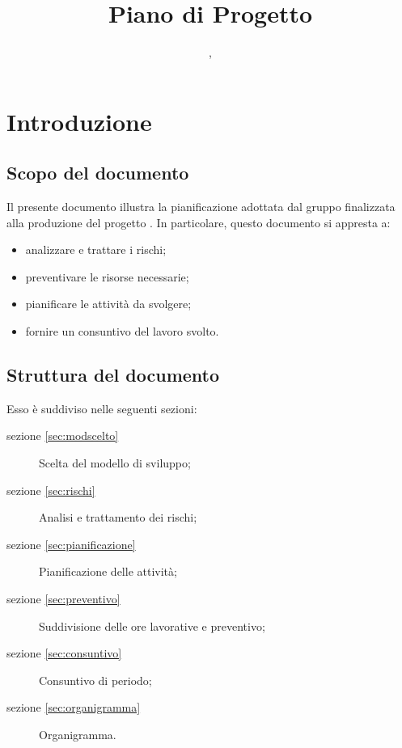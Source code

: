 

\author{\LB, \PB}
\supervisor{\GG, \MM}
\dest{\TV, \ZU}
\title{Piano di Progetto}


\maketitle

\tableofcontents
\listoffigures
\newpage






\section{Introduzione}

\subsection{Scopo del documento}
Il presente documento illustra la pianificazione adottata dal gruppo \hx{} finalizzata alla produzione del progetto \proj.
In particolare, questo documento si appresta a:
\begin{itemize}
	\item analizzare e trattare i rischi;
	\item preventivare le risorse necessarie;
	\item pianificare le attività da svolgere;
	\item fornire un consuntivo del lavoro svolto.
\end{itemize}

\subsection{Struttura del documento}
Esso è suddiviso nelle seguenti sezioni:
\begin{description}
	\item[sezione \ref{sec:modscelto}] Scelta del modello di sviluppo;
	\item[sezione \ref{sec:rischi}] Analisi e trattamento dei rischi;
	\item[sezione \ref{sec:pianificazione}] Pianificazione delle attività;
	\item[sezione \ref{sec:preventivo}] Suddivisione delle ore lavorative e preventivo;
           \item[sezione \ref{sec:consuntivo}] Consuntivo di periodo;
	\item[sezione \ref{sec:organigramma}] Organigramma.
\end{description}

